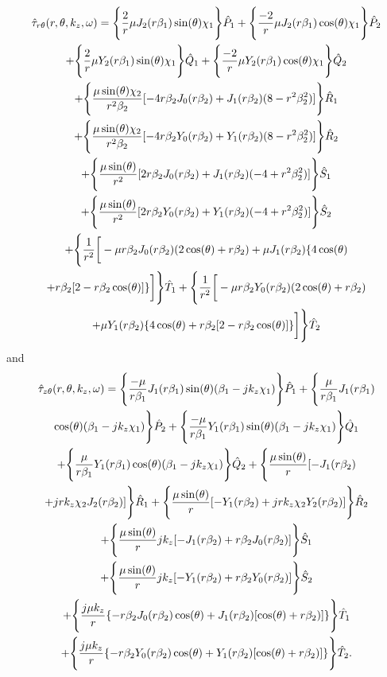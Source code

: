\documentclass[10pt]{asme2ej}
\begin{document}
    \begin{multline}\label{shear stress r,theta appendix}
        \Hat{\tau}_{r\theta}(r,\theta,k_z,\omega) = \Bigg\{\frac{2}{r}\mu J_2(r\beta_1)\sin(\theta)\chi_1\Bigg\}\Hat{P}_1 + \Bigg\{\frac{-2}{r}\mu J_2(r\beta_1)\cos(\theta)\chi_1\Bigg\}\Hat{P}_2\\ + \Bigg\{\frac{2}{r}\mu Y_2(r\beta_1)\sin(\theta)\chi_1\Bigg\}\Hat{Q}_1 + \Bigg\{\frac{-2}{r}\mu Y_2(r\beta_1)\cos(\theta)\chi_1\Bigg\}\Hat{Q}_2\\ + \Bigg\{\frac{\mu\sin(\theta)\chi_2}{r^2\beta_2}[-4r\beta_2 J_0(r\beta_2) + J_1(r\beta_2)(8-r^2\beta_2^2)]\Bigg\}\Hat{R}_1\\ + \Bigg\{\frac{\mu\sin(\theta)\chi_2}{r^2\beta_2}[-4r\beta_2 Y_0(r\beta_2) + Y_1(r\beta_2)(8-r^2\beta_2^2)]\Bigg\}\Hat{R}_2\\ + \Bigg\{\frac{\mu\sin(\theta)}{r^2}[2r\beta_2 J_0(r\beta_2) + J_1(r\beta_2)(-4+r^2\beta_2^2)]\Bigg\}\Hat{S}_1\\ + \Bigg\{\frac{\mu\sin(\theta)}{r^2}[2r\beta_2 Y_0(r\beta_2) + Y_1(r\beta_2)(-4+r^2\beta_2^2)]\Bigg\}\Hat{S}_2\\ + \Bigg\{\frac{1}{r^2}\bigg[-\mu r\beta_2 J_0(r\beta_2)(2\cos(\theta) + r\beta_2) + \mu J_1(r\beta_2)\{4\cos(\theta)\\ + r\beta_2[2-r\beta_2\cos(\theta)]\}\bigg]\Bigg\}\Hat{T}_1 + \Bigg\{\frac{1}{r^2}\bigg[-\mu r\beta_2 Y_0(r\beta_2)(2\cos(\theta) + r\beta_2)\\ + \mu Y_1(r\beta_2)\{4\cos(\theta) + r\beta_2[2-r\beta_2\cos(\theta)]\}\bigg]\Bigg\}\Hat{T}_2
    \end{multline}
    and
    \begin{multline}\label{shear stress z,theta appendix}
        \Hat{\tau}_{z\theta}(r,\theta,k_z,\omega) = \Bigg\{\frac{-\mu}{r\beta_1}J_1(r\beta_1)\sin(\theta)(\beta_1 - jk_z\chi_1)\Bigg\}\Hat{P}_1 +  \Bigg\{\frac{\mu}{r\beta_1}J_1(r\beta_1)\\ \cos(\theta)(\beta_1 - jk_z\chi_1)\Bigg\}\Hat{P}_2 + \Bigg\{\frac{-\mu}{r\beta_1}Y_1(r\beta_1)\sin(\theta)(\beta_1 - jk_z\chi_1)\Bigg\}\Hat{Q}_1\\ + \Bigg\{\frac{\mu}{r\beta_1}Y_1(r\beta_1)\cos(\theta)(\beta_1 - jk_z\chi_1)\Bigg\}\Hat{Q}_2 + \Bigg\{\frac{\mu\sin(\theta)}{r}[-J_1(r\beta_2)\\ + j r k_z \chi_2 J_2(r\beta_2)]\Bigg\}\Hat{R}_1 + \Bigg\{\frac{\mu\sin(\theta)}{r}[-Y_1(r\beta_2) + j r k_z \chi_2 Y_2(r\beta_2)]\Bigg\}\Hat{R}_2\\ + \Bigg\{\frac{\mu\sin(\theta)}{r}jk_z[-J_1(r\beta_2) + r\beta_2 J_0(r\beta_2)]\Bigg\}\Hat{S}_1\\ +  \Bigg\{\frac{\mu\sin(\theta)}{r}jk_z[-Y_1(r\beta_2) + r\beta_2 Y_0(r\beta_2)]\Bigg\}\Hat{S}_2\\ + \Bigg\{\frac{j\mu k_z}{r}\{-r\beta_2 J_0(r\beta_2)\cos(\theta) + J_1(r\beta_2)[\cos(\theta) + r\beta_2)]\}\Bigg\}\Hat{T}_1\\ + \Bigg\{\frac{j\mu k_z}{r}\{-r\beta_2 Y_0(r\beta_2)\cos(\theta) + Y_1(r\beta_2)[\cos(\theta) + r\beta_2)]\}\Bigg\}\Hat{T}_2.
    \end{multline}
\end{document}
